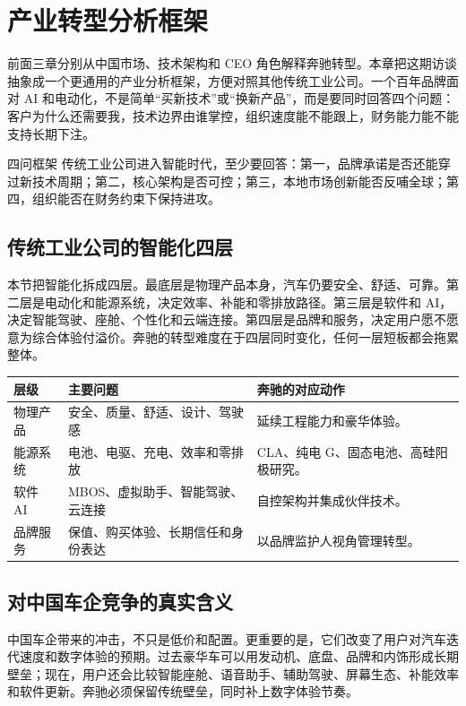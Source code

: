 \section{产业转型分析框架}

前面三章分别从中国市场、技术架构和 CEO 角色解释奔驰转型。本章把这期访谈抽象成一个更通用的产业分析框架，方便对照其他传统工业公司。一个百年品牌面对 AI 和电动化，不是简单“买新技术”或“换新产品”，而是要同时回答四个问题：客户为什么还需要我，技术边界由谁掌控，组织速度能不能跟上，财务能力能不能支持长期下注。

\begin{importantbox}{四问框架}
传统工业公司进入智能时代，至少要回答：第一，品牌承诺是否还能穿过新技术周期；第二，核心架构是否可控；第三，本地市场创新能否反哺全球；第四，组织能否在财务约束下保持进攻。
\end{importantbox}

\subsection{传统工业公司的智能化四层}

本节把智能化拆成四层。最底层是物理产品本身，汽车仍要安全、舒适、可靠。第二层是电动化和能源系统，决定效率、补能和零排放路径。第三层是软件和 AI，决定智能驾驶、座舱、个性化和云端连接。第四层是品牌和服务，决定用户愿不愿意为综合体验付溢价。奔驰的转型难度在于四层同时变化，任何一层短板都会拖累整体。

\noindent\begin{tabularx}{\textwidth}{p{}p{}X}
\toprule
层级 & 主要问题 & 奔驰的对应动作 \\
\midrule
物理产品 & 安全、质量、舒适、设计、驾驶感 & 延续工程能力和豪华体验。 \\
能源系统 & 电池、电驱、充电、效率和零排放 & CLA、纯电 G、固态电池、高硅阳极研究。 \\
软件 AI & MBOS、虚拟助手、智能驾驶、云连接 & 自控架构并集成伙伴技术。 \\
品牌服务 & 保值、购买体验、长期信任和身份表达 & 以品牌监护人视角管理转型。 \\
\bottomrule
\end{tabularx}

\subsection{对中国车企竞争的真实含义}

中国车企带来的冲击，不只是低价和配置。更重要的是，它们改变了用户对汽车迭代速度和数字体验的预期。过去豪华车可以用发动机、底盘、品牌和内饰形成长期壁垒；现在，用户还会比较智能座舱、语音助手、辅助驾驶、屏幕生态、补能效率和软件更新。奔驰必须保留传统壁垒，同时补上数字体验节奏。

